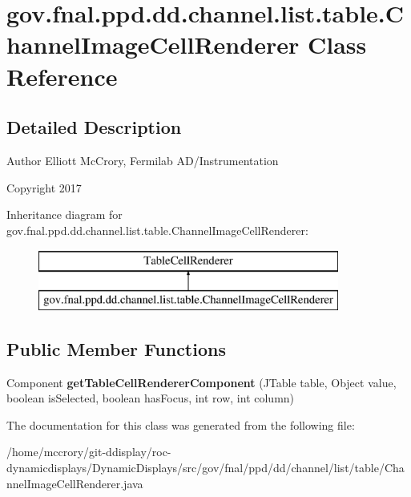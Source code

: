 \hypertarget{classgov_1_1fnal_1_1ppd_1_1dd_1_1channel_1_1list_1_1table_1_1ChannelImageCellRenderer}{\section{gov.\-fnal.\-ppd.\-dd.\-channel.\-list.\-table.\-Channel\-Image\-Cell\-Renderer Class Reference}
\label{classgov_1_1fnal_1_1ppd_1_1dd_1_1channel_1_1list_1_1table_1_1ChannelImageCellRenderer}
}


\subsection{Detailed Description}
\begin{DoxyAuthor}{Author}
Elliott Mc\-Crory, Fermilab A\-D/\-Instrumentation 
\end{DoxyAuthor}
\begin{DoxyCopyright}{Copyright}
2017 
\end{DoxyCopyright}
Inheritance diagram for gov.\-fnal.\-ppd.\-dd.\-channel.\-list.\-table.\-Channel\-Image\-Cell\-Renderer\-:\begin{figure}[H]
\begin{center}
\leavevmode
\includegraphics[height=2.000000cm]{classgov_1_1fnal_1_1ppd_1_1dd_1_1channel_1_1list_1_1table_1_1ChannelImageCellRenderer}
\end{center}
\end{figure}
\subsection*{Public Member Functions}
\begin{DoxyCompactItemize}
\item 
\hypertarget{classgov_1_1fnal_1_1ppd_1_1dd_1_1channel_1_1list_1_1table_1_1ChannelImageCellRenderer_a9f7de2d0208d162c90d95e071c1718b0}{Component {\bfseries get\-Table\-Cell\-Renderer\-Component} (J\-Table table, Object value, boolean is\-Selected, boolean has\-Focus, int row, int column)}\label{classgov_1_1fnal_1_1ppd_1_1dd_1_1channel_1_1list_1_1table_1_1ChannelImageCellRenderer_a9f7de2d0208d162c90d95e071c1718b0}

\end{DoxyCompactItemize}


The documentation for this class was generated from the following file\-:\begin{DoxyCompactItemize}
\item 
/home/mccrory/git-\/ddisplay/roc-\/dynamicdisplays/\-Dynamic\-Displays/src/gov/fnal/ppd/dd/channel/list/table/Channel\-Image\-Cell\-Renderer.\-java\end{DoxyCompactItemize}
